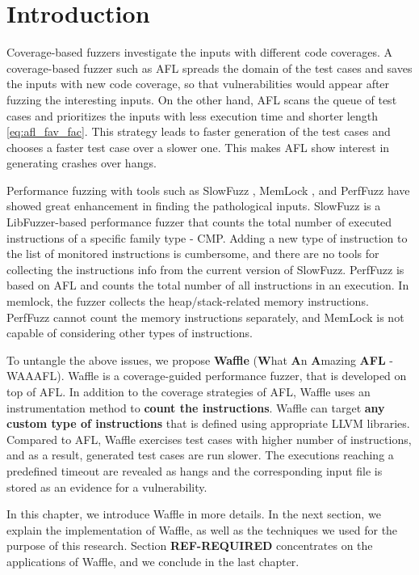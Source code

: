 \section{Introduction}

Coverage-based fuzzers investigate the inputs with different code coverages. A coverage-based fuzzer such as AFL spreads the domain of the test cases and saves the inputs with new code coverage, so that vulnerabilities would appear after fuzzing the interesting inputs. On the other hand, AFL scans the queue of test cases and prioritizes the inputs with less execution time and shorter length \ref{eq:afl_fav_fac}. This strategy leads to faster generation of the test cases and chooses a faster test case over a slower one. This makes AFL show interest in generating crashes over hangs.

Performance fuzzing with tools such as SlowFuzz \cite{petsios2017slowfuzz}, MemLock \cite{wen2020memlock}, and PerfFuzz \cite{lemieux2018perffuzz} have showed great enhancement in finding the pathological inputs. SlowFuzz is a LibFuzzer-based performance fuzzer that counts the total number of executed instructions of a specific family type - CMP. Adding a new type of instruction to the list of monitored instructions is cumbersome, and there are no tools for collecting the instructions info from the current version of SlowFuzz. PerfFuzz is based on AFL and counts the total number of all instructions in an execution. In memlock, the fuzzer collects the heap/stack-related memory instructions. PerfFuzz cannot count the memory instructions separately, and MemLock is not capable of considering other types of instructions.

To untangle the above issues, we propose \textbf{Waffle} (\textbf{W}hat \textbf{A}n \textbf{A}mazing \textbf{AFL} - WAAAFL). Waffle is a coverage-guided performance fuzzer, that is developed on top of AFL. In addition to the coverage strategies of AFL, Waffle uses an instrumentation method to \textbf{count the instructions}. Waffle can target \textbf{any custom type of instructions} that is defined using appropriate LLVM libraries. Compared to AFL, Waffle exercises test cases with higher number of instructions, and as a result, generated test cases are run slower. The executions reaching a predefined timeout are revealed as hangs and the corresponding input file is stored as an evidence for a vulnerability.

In this chapter, we introduce Waffle in more details. In the next section, we explain the implementation of Waffle, as well as the techniques we used for the purpose of this research. Section \textbf{REF-REQUIRED} concentrates on the applications of Waffle, and we conclude in the last chapter.

